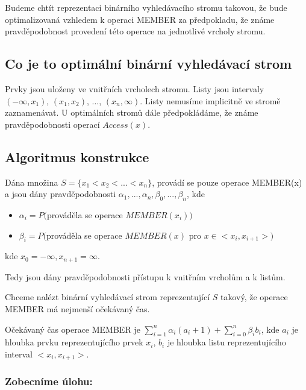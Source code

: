 Budeme chtít reprezentaci binárního vyhledávacího stromu takovou, že 
bude optimalizovaná vzhledem k operaci MEMBER za předpokladu, že známe
pravděpodobnost provedení této operace na jednotlivé vrcholy stromu.

\subsection{Co je to optimální binární vyhledávací strom}

Prvky jsou uloženy ve vnitřních vrcholech stromu. 
Listy jsou intervaly $(-\infty, x_1)$, $(x_1, x_2)$, 
$\ldots$, $(x_n, \infty)$. Listy nemusíme implicitně
ve stromě zaznamenávat.
U optimálních stromů dále předpokládáme, že známe pravděpodobnosti 
operací $Access(x)$. 

\subsection{Algoritmus konstrukce}

Dána množina $S = \{x_1 < x_2 < ... < x_n \}$, provádí se pouze operace
MEMBER(x) a jsou dány pravděpodobnosti 
$\alpha_1, ..., \alpha_n, \beta_0, ..., \beta_n$, kde 
\begin{itemize}
\item $\alpha_i = P($prováděla se operace $MEMBER(x_i))$
\item $\beta_i = P($prováděla se operace $MEMBER(x)$ pro 
   $x \in <x_i, x_{i+1}>)$
\end{itemize}

kde $x_0 = - \infty, x_{n+1} = \infty$.
\par
Tedy jsou dány pravděpodobnosti přístupu k vnitřním vrcholům a k listům.
\par

Chceme nalézt binární vyhledávací strom reprezentující $S$ takový, že
operace MEMBER má nejmenší očekávaný čas.
\par
Očekávaný čas operace MEMBER je $\sum_{i=1}^{n} \alpha_i(a_i + 1) +
\sum_{i=0}^{n} \beta_i b_i$, kde 
$a_i$ je hloubka prvku reprezentujícího prvek $x_i$, $b_i$ je hloubka
listu reprezentujícího interval $<x_i, x_{i+1}>$.
\par

\subsubsection{Zobecníme úlohu:}

